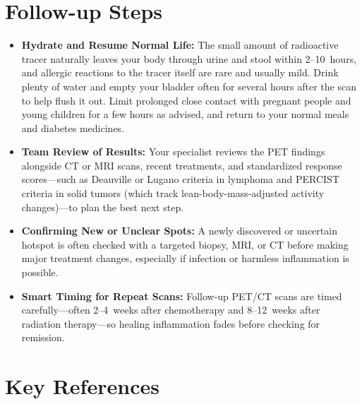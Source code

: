 \section{Follow-up Steps}

\begin{itemize}
    \item \textbf{Hydrate and Resume Normal Life:} The small amount of radioactive tracer naturally leaves your body through urine and stool within 2--10~hours, and allergic reactions to the tracer itself are rare and usually mild. Drink plenty of water and empty your bladder often for several hours after the scan to help flush it out. Limit prolonged close contact with pregnant people and young children for a few hours as advised, and return to your normal meals and diabetes medicines.
    \item \textbf{Team Review of Results:} Your specialist reviews the PET findings alongside CT or MRI scans, recent treatments, and standardized response scores---such as Deauville or Lugano criteria in lymphoma and PERCIST criteria in solid tumors (which track lean-body-mass-adjusted activity changes)---to plan the best next step.
    \item \textbf{Confirming New or Unclear Spots:} A newly discovered or uncertain hotspot is often checked with a targeted biopsy, MRI, or CT before making major treatment changes, especially if infection or harmless inflammation is possible.
    \item \textbf{Smart Timing for Repeat Scans:} Follow-up PET/CT scans are timed carefully---often 2--4~weeks after chemotherapy and 8--12~weeks after radiation therapy---so healing inflammation fades before checking for remission.
\end{itemize}

\section{Key References}

